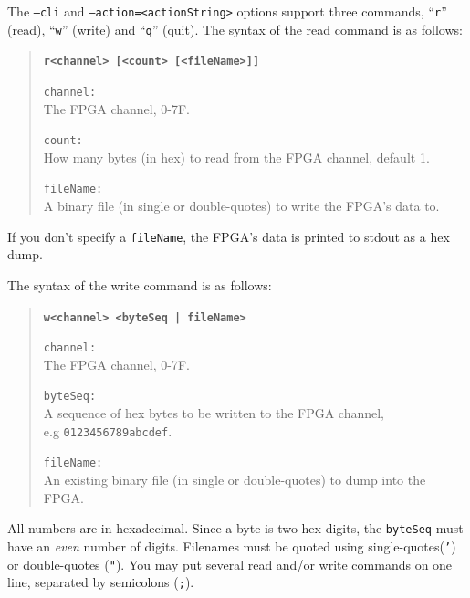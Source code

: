 The \texttt{--cli} and \texttt{--action=<actionString>} options support three commands, ``\texttt{r}'' (read), ``\texttt{w}'' (write) and ``\texttt{q}'' (quit). The syntax of the read command is as follows:

\begin{quote}
\textbf{\texttt{r<channel> [<count> [<fileName>]]}}

\begin{desc}
  \item[\texttt{channel:}] \hfill \\
    The FPGA channel, 0-7F.
  \item[\texttt{count:}] \hfill \\
    How many bytes (in hex) to read from the FPGA channel, default 1.
  \item[\texttt{fileName:}] \hfill \\
    A binary file (in single or double-quotes) to write the FPGA's data to.
\end{desc}
\end{quote}

If you don't specify a \texttt{fileName}, the FPGA's data is printed to stdout as a hex dump.

\newpage
The syntax of the write command is as follows:

\begin{quote}
\textbf{\texttt{w<channel> <byteSeq | fileName>}}

\begin{desc}
  \item[\texttt{channel:}] \hfill \\
    The FPGA channel, 0-7F.
  \item[\texttt{byteSeq:}] \hfill \\
    A sequence of hex bytes to be written to the FPGA channel,\\e.g \texttt{0123456789abcdef}.
  \item[\texttt{fileName:}] \hfill \\
    An existing binary file (in single or double-quotes) to dump into the FPGA.
\end{desc}
\end{quote}

All numbers are in hexadecimal. Since a byte is two hex digits, the \texttt{byteSeq} must have an \textit{even} number of digits. Filenames must be quoted using single-quotes(\texttt{'}) or double-quotes (\texttt{"}). You may put several read and/or write commands on one line, separated by semicolons (\texttt{;}).

